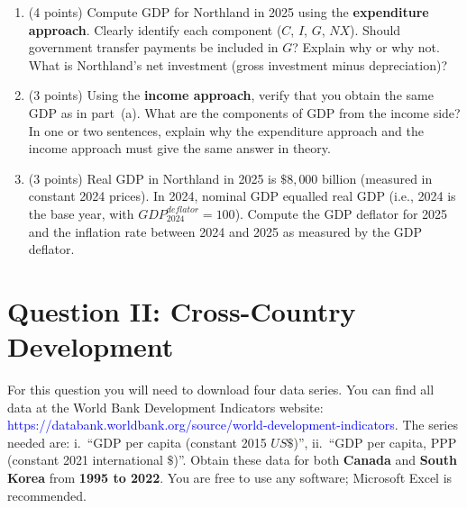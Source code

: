 \documentclass[letterpaper,12pt]{article}
\theoremstyle{dotlessS}
\begin{document}
\begin{enumerate}[label=(\alph*)]
\item (4 points) Compute GDP for Northland in 2025 using the \textbf{expenditure approach}. Clearly identify each component ($C$, $I$, $G$, $NX$). Should government transfer payments be included in $G$? Explain why or why not. What is Northland's net investment (gross investment minus depreciation)?

\item (3 points) Using the \textbf{income approach}, verify that you obtain the same GDP as in part~(a). What are the components of GDP from the income side? In one or two sentences, explain why the expenditure approach and the income approach must give the same answer in theory.

\item (3 points) Real GDP in Northland in 2025 is $\$8{,}000$ billion (measured in constant 2024 prices). In 2024, nominal GDP equalled real GDP (i.e., 2024 is the base year, with $GDP^{deflator}_{2024} = 100$). Compute the GDP deflator for 2025 and the inflation rate between 2024 and 2025 as measured by the GDP deflator.
\end{enumerate}


\section*{Question II: Cross-Country Development}
For this question you will need to download four data series. You can find all data at the World Bank Development Indicators website: \\
\textcolor{blue}{https://databank.worldbank.org/source/world-development-indicators}. The series needed are: i.~``GDP per capita (constant 2015 $US\$$)'', ii.~``GDP per capita, PPP (constant 2021 international $\$$)''. Obtain these data for both \textbf{Canada} and \textbf{South Korea} from \textbf{1995 to 2022}. You are free to use any software; Microsoft Excel is recommended.
\end{document}
